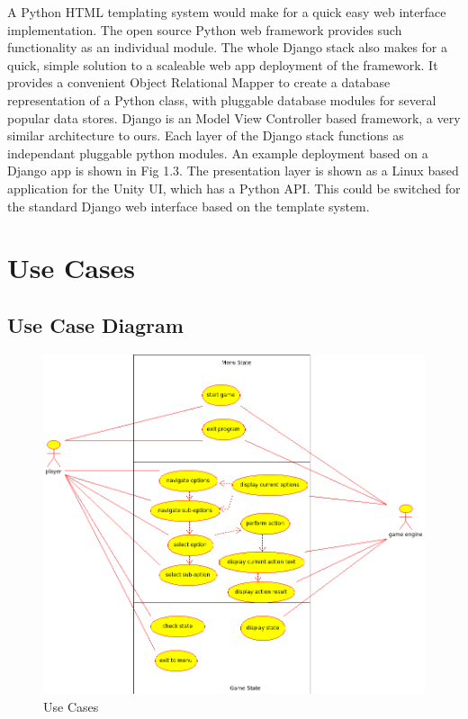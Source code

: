\documentclass[11pt]{report}
\begin{document}
A Python HTML templating system would make for a quick easy web interface implementation. The open source Python web framework provides such functionality as an individual module. The whole Django stack also makes for a quick, simple solution to a scaleable web app deployment of the framework. It provides a convenient Object Relational Mapper to create a database representation of a Python class, with pluggable database modules for several popular data stores. Django is an Model View Controller based framework, a very similar architecture to ours. Each layer of the Django stack functions as independant pluggable python modules. An example deployment based on a Django app is shown in Fig 1.3. The presentation layer is shown as a Linux based application for the Unity UI, which has a Python API. This could be switched for the standard Django web interface based on the template system.
	
\section{Use Cases}
\subsection{Use Case Diagram}
\begin{figure}[htp]
\centering
\includegraphics[scale=0.6]{PyturnUseCases.png}
\caption{Use Cases}
\label{Use Cases}
\end{figure}
\end{document}
